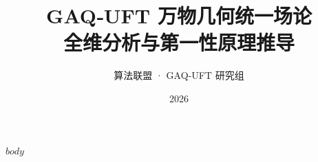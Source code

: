 \documentclass[12pt,a4paper]{book}
\title{\textbf{GAQ‑UFT 万物几何统一场论}\\ 全维分析与第一性原理推导}
\author{算法联盟 · GAQ‑UFT 研究组}
\date{2026}
\begin{document}
\maketitle
\tableofcontents

$body$



\end{document}
